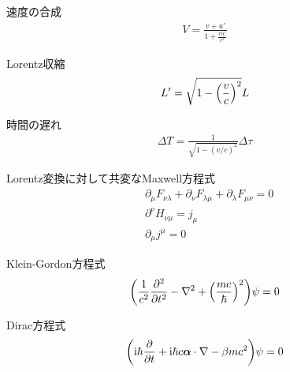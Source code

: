 \documentclass{report}
\begin{document}
  \begin{itembox}[l]{速度の合成}
    \begin{align}
      V = \frac{v + u'}{1 + \frac{vu'}{c^2}}
    \end{align}
  \end{itembox}

  \begin{itembox}[l]{Lorentz収縮}
    \begin{align}
      L' = \sqrt{1-\qty(\frac{v}{c})^2}L
    \end{align}
  \end{itembox}

  \begin{itembox}[l]{時間の遅れ}
    \begin{align}
      \Delta T = \frac{1}{\sqrt{1 - (v/c)^2}} \Delta \tau
    \end{align}
  \end{itembox}

  \begin{itembox}[l]{Lorentz変換に対して共変なMaxwell方程式}
    \begin{align}
      &\partial_\mu F_{\nu\lambda} + \partial_\nu F_{\lambda\mu} + \partial_\lambda F_{\mu\nu} = 0\\
      &\partial^{\nu}H_{\nu\mu}=j_\mu\\
      &\partial_\mu j^\mu = 0
    \end{align}
  \end{itembox}

  \begin{itembox}[l]{Klein-Gordon方程式}
    \begin{equation}
      \qty(\frac{1}{c^2}\frac{\partial^2}{\partial t^2} - \nabla^2 + \qty(\frac{mc}{\hbar})^2)\psi = 0
    \end{equation}
  \end{itembox}

  \begin{itembox}[l]{Dirac方程式}
    \begin{align}
      \qty(\mathrm{i}\hbar \frac{\partial}{\partial t} + \mathrm{i} \hbar c \bm{\alpha}\cdot \nabla - \beta mc^2)\psi = 0
    \end{align}
    \end{itembox}
\end{document}
